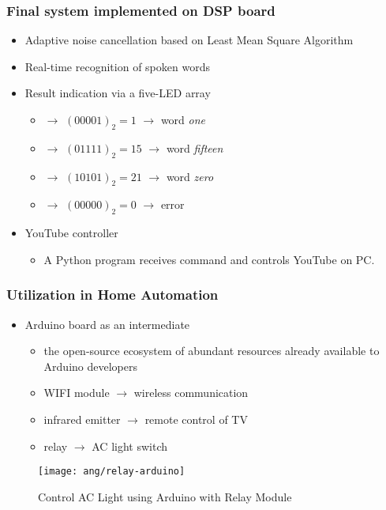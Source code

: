 
\begin{frame}
\frametitle{Final system implemented on DSP board}
\begin{itemize}
	\item Adaptive noise cancellation based on Least Mean Square Algorithm
	\item Real-time recognition of spoken words
	\item Result indication via a five-LED array
		\begin{itemize}
		\item \LED\offLED\offLED\offLED\offLED\onLED $\longrightarrow$ $(00001)_2 = 1$ $\longrightarrow$ word \textit{one}
		\item \LED\offLED\onLED\onLED\onLED\onLED $\longrightarrow$ $(01111)_2 = 15$ $\longrightarrow$ word \textit{fifteen}
		\item \LED\onLED\offLED\onLED\offLED\onLED $\longrightarrow$ $(10101)_2 = 21$ $\longrightarrow$ word \textit{zero}
		\item \LED\offLED\offLED\offLED\offLED\offLED $\longrightarrow$ $(00000)_2 = 0$ $\longrightarrow$ error
		\end{itemize}
	\item YouTube controller
		\begin{itemize}
		\item A Python program receives command and controls YouTube on PC.
		\end{itemize}
\end{itemize}
\end{frame}


\begin{frame}
\frametitle{Utilization in Home Automation}
\begin{itemize}
	\item Arduino\textsuperscript{\textregistered} board as an intermediate
		\begin{itemize}
		\item the open-source ecosystem of abundant resources already available to Arduino developers
		\item WIFI module $\longrightarrow$ wireless communication
		\item infrared emitter $\longrightarrow$ remote control of TV
		\item relay $\longrightarrow$ AC light switch
		\end{itemize}
\end{itemize}

\begin{figure}[H]
\centering
\texttt{[image: ang/relay-arduino]}
\caption{Control AC Light using Arduino with Relay Module \cite{relay-arduino}}
\end{figure}
\end{frame}
